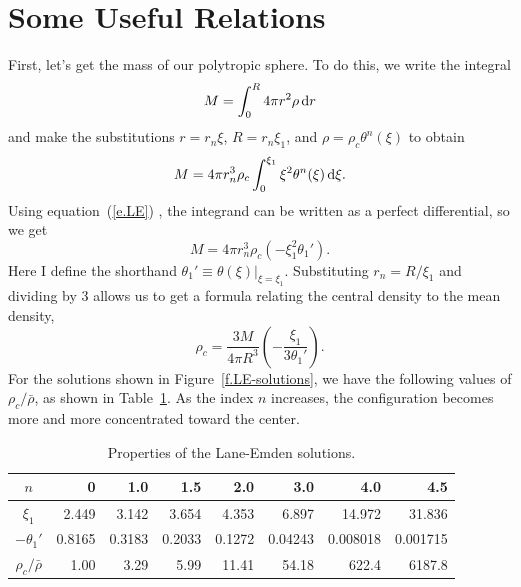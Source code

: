 \section{Some Useful Relations}

First, let's get the mass of our polytropic sphere.  To do this, we write the integral
\[ M = \int_{0}^{R} 4\pi r^{2} \rho\,\mathrm{d} r \]
and make the substitutions $r = r_{n}\xi$, $R = r_{n}\xi_{1}$, and $\rho = \rho_{c}\theta^{n}(\xi)$ to obtain
\[
M = 4\pi r_{n}^{3}\rho_{c}\int_{0}^{\xi_{1}} \xi^{2}\theta^{n}(\xi)\,\mathrm{d}\xi.
\]
Using equation~(\ref{e.LE}) , the integrand can be written as a perfect differential, so we get
\begin{equation}\label{e.LE-mass}
M = 4\pi r_{n}^{3} \rho_{c}\left(-\xi_{1}^{2} \theta_{1}'\right).
\end{equation}
Here I define the shorthand $\theta_{1}' \equiv \theta(\xi)|_{\xi=\xi_{1}}$.  Substituting $r_{n} = R/\xi_{1}$ and dividing by 3 allows us to get a formula relating the central density to the mean density,
\begin{equation}\label{e.LE-density-ratio}
\rho_{c} = \frac{3M}{4\pi R^{3}}\left(-\frac{\xi_{1}}{3\theta_{1}'}\right).
\end{equation}
For the solutions shown in Figure~\ref{f.LE-solutions}, we have the following values of $\rho_{c}/\bar{\rho}$, as shown in Table~\ref{t.LE-properties}.
As the index $n$ increases, the configuration becomes more and more concentrated toward the center.

\begin{table}[htpb]
\caption{Properties of the Lane-Emden solutions.\label{t.LE-properties}}
\begin{center}
\begin{tabular}{c|rrrrrrr}
\hline
$n$ & 0 & 1.0 & 1.5 & 2.0 & 3.0 & 4.0 & 4.5 \\
\hline\hline
$\xi_{1}$ & 2.449 & 3.142 & 3.654 & 4.353 & 6.897 & 14.972 & 31.836\\
$-\theta_{1}'$ & 0.8165 & 0.3183 & 0.2033 & 0.1272 & 0.04243 & 0.008018 & 0.001715\\
$\rho_{c}/\bar{\rho}$ & 1.00 & 3.29 & 5.99 & 11.41 & 54.18 & 622.4 & 6187.8\\
\hline
\end{tabular}
\end{center}
\end{table}

